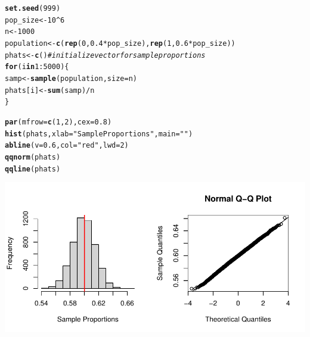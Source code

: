 \documentclass[fleqn, 11pt]{article}\usepackage[]{graphicx}\usepackage[]{color}
\makeatletter
\def\maxwidth{ %
  \ifdim\Gin@nat@width>\linewidth
    \linewidth
  \else
    \Gin@nat@width
  \fi
}
\newcommand{\hlnum}[1]{\textcolor[rgb]{0.686,0.059,0.569}{#1}}%
\newcommand{\hlstr}[1]{\textcolor[rgb]{0.192,0.494,0.8}{#1}}%
\newcommand{\hlcom}[1]{\textcolor[rgb]{0.678,0.584,0.686}{\textit{#1}}}%
\newcommand{\hlopt}[1]{\textcolor[rgb]{0,0,0}{#1}}%
\newcommand{\hlstd}[1]{\textcolor[rgb]{0.345,0.345,0.345}{#1}}%
\newcommand{\hlkwa}[1]{\textcolor[rgb]{0.161,0.373,0.58}{\textbf{#1}}}%
\newcommand{\hlkwb}[1]{\textcolor[rgb]{0.69,0.353,0.396}{#1}}%
\newcommand{\hlkwc}[1]{\textcolor[rgb]{0.333,0.667,0.333}{#1}}%
\newcommand{\hlkwd}[1]{\textcolor[rgb]{0.737,0.353,0.396}{\textbf{#1}}}%
\newenvironment{kframe}{%
 \def\at@end@of@kframe{}%
 \ifinner\ifhmode%
  \def\at@end@of@kframe{\end{minipage}}%
  \begin{minipage}{\columnwidth}%
 \fi\fi%
 \def\FrameCommand##1{\hskip\@totalleftmargin \hskip-\fboxsep
 \colorbox{shadecolor}{##1}\hskip-\fboxsep
     \hskip-\linewidth \hskip-\@totalleftmargin \hskip\columnwidth}%
 \MakeFramed {\advance\hsize-\width
   \@totalleftmargin\z@ \linewidth\hsize
   \@setminipage}}%
 {\par\unskip\endMakeFramed%
 \at@end@of@kframe}
\newenvironment{knitrout}{}{} %
\makeatother
\begin{document}
\begin{knitrout}
\color{fgcolor}\begin{kframe}
\begin{alltt}
\hlkwd{set.seed}\hlstd{(}\hlnum{999}\hlstd{)}
\hlstd{pop_size} \hlkwb{<-} \hlnum{10}\hlopt{^}\hlnum{6}
\hlstd{n} \hlkwb{<-} \hlnum{1000}
\hlstd{population} \hlkwb{<-} \hlkwd{c}\hlstd{(}\hlkwd{rep}\hlstd{(}\hlnum{0}\hlstd{,} \hlnum{0.4}\hlopt{*}\hlstd{pop_size),} \hlkwd{rep}\hlstd{(}\hlnum{1}\hlstd{,} \hlnum{0.6}\hlopt{*}\hlstd{pop_size))}
\hlstd{phats} \hlkwb{<-} \hlkwd{c}\hlstd{()} \hlcom{# initialize vector for sample proportions}
\hlkwa{for}\hlstd{(i} \hlkwa{in} \hlnum{1}\hlopt{:}\hlnum{5000}\hlstd{) \{}
  \hlstd{samp} \hlkwb{<-} \hlkwd{sample}\hlstd{(population,} \hlkwc{size} \hlstd{= n)}
  \hlstd{phats[i]} \hlkwb{<-} \hlkwd{sum}\hlstd{(samp)} \hlopt{/} \hlstd{n}
\hlstd{\}}
\end{alltt}
\end{kframe}
\end{knitrout}
\begin{knitrout}
\color{fgcolor}\begin{kframe}
\begin{alltt}
\hlkwd{par}\hlstd{(}\hlkwc{mfrow} \hlstd{=} \hlkwd{c}\hlstd{(}\hlnum{1}\hlstd{,} \hlnum{2}\hlstd{),} \hlkwc{cex}\hlstd{=}\hlnum{0.8}\hlstd{)}
\hlkwd{hist}\hlstd{(phats,} \hlkwc{xlab} \hlstd{=} \hlstr{"Sample Proportions"}\hlstd{,} \hlkwc{main} \hlstd{=} \hlstr{""}\hlstd{)}
\hlkwd{abline}\hlstd{(}\hlkwc{v} \hlstd{=} \hlnum{0.6}\hlstd{,} \hlkwc{col} \hlstd{=} \hlstr{"red"}\hlstd{,} \hlkwc{lwd} \hlstd{=} \hlnum{2}\hlstd{)}
\hlkwd{qqnorm}\hlstd{(phats)}
\hlkwd{qqline}\hlstd{(phats)}
\end{alltt}
\end{kframe}
\includegraphics[width=\maxwidth]{figure/unnamed-chunk-2-1} 
\end{knitrout}
\end{document}
